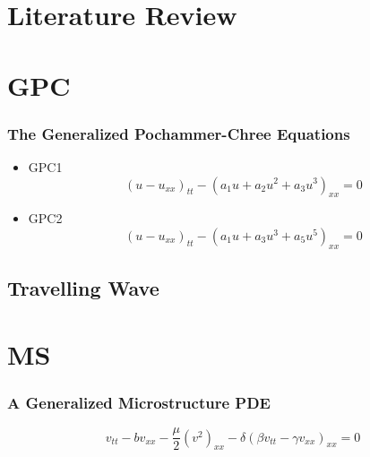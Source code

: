 \documentclass[10pt]{beamer}
\begin{document}
\section{Literature Review}


\section{GPC}
\frame
{
  \frametitle{The Generalized Pochammer-Chree Equations}
\begin{itemize}
\item GPC1
\begin{equation}\label{eq:GPC1}
\left( u - u_{xx} \right)_{tt} - \left( a_1 u + a_2 u^2 + a_3 u^3 \right)_{xx} =0  
\end{equation}
\item GPC2
\begin{equation}  \label{eq:GPC2} 
\left( u - u_{xx} \right)_{tt} - \left( a_1 u + a_3 u^3 + a_5 u^5 \right)_{xx} =0
\end{equation}
\end{itemize}
}
\subsection{Travelling Wave}
\section{MS}
\frame
{
  \frametitle{A Generalized Microstructure PDE}

\begin{equation}\label{eq:MS}
v_{tt} - b v_{xx} - \frac{\mu}{2} \left( v^2 \right)_{xx} - \delta \left( \beta v_{tt} - \gamma v_{xx}\right)_{xx} = 0 
\end{equation}

}
\end{document}
